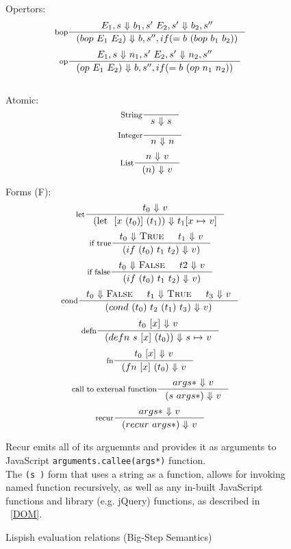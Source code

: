 \begin{figure}[ht]
\centering
Opertors:\
\[
\inference[bop]{E_1, s \ $$\Downarrow$$ \ b_1, s' \ E_2, s' \ $$\Downarrow$$ \ b_2, s''}
{(bop \ E_1 \ E_2) \ $$\Downarrow$$ \ b, s'', if (= b \ (bop \ b_1 \ b_2))}
\]
\[
\inference[op]{E_1, s \ $$\Downarrow$$ \ n_1, s' \ E_2, s' \ $$\Downarrow$$ \ n_2, s''}
{(op \ E_1 \ E_2) \ $$\Downarrow$$ \ b, s'', if (= b \ (op \ n_1 \ n_2))}
\] \\

\vspace*{15pt}
Atomic: \
\[
\inference[String]{}
{s \ $$\Downarrow$$ \ s}
\]
\[
\inference[Integer]{}
{n \ $$\Downarrow$$ \ n}
\]
\[
\inference[List]{n \ $$\Downarrow$$ \ v}
{(n) \ $$\Downarrow$$ \ v}
\]

\vspace*{15pt}
Forms (F): \
\[
\inference[let]{t_0 \ $$\Downarrow$$ \ v}
{(\text{let } \ {[x \ (t_0)]} \ (t_1)) \ $$\Downarrow$$ \ t_1 {[}x \ $$\mapsto$$ \ v{]} }
\]
\[
\inference[if true]{{t_0} \ $$\Downarrow$$ \ \textsc{True} & t_1 \ $$\Downarrow$$ \ v}
{(if \ (t_0) \ t_1 \ t_2) \ $$\Downarrow$$ \ v) }
\]
\[
\inference[if false]{t_0 \ $$\Downarrow$$ \ \textsc{False} & t2 \ $$\Downarrow$$ \ v}
{(if \ (t_0) \ t_1 \ t_2) \ $$\Downarrow$$ \ v) }
\]
\[
\inference[cond]{t_0 \ $$\Downarrow$$ \ \textsc{False} & t_1 \ $$\Downarrow$$ \ \textsc{True} & t_3 \ $$\Downarrow$$ \ v}
{(cond \ (t_0) \ t_2 \ (t_1) \ t_3) \ $$\Downarrow$$ \ v) }
\]
\[
\inference[defn]{ {t_0 \ [x]} \ $$\Downarrow$$ \ v}
{(defn \ s \ {[x]} \ (t_0)) \ $$\Downarrow$$ \ s \ $$\mapsto$$ \ v }
\]
\[
\inference[fn]{ {t_0 \ [x]} \ $$\Downarrow$$ \ v}
{(fn \ {[x]}  \ (t_0) \ $$\Downarrow$$ \ v }
\]
\[
\inference[call to external function]{ {args*} \ $$\Downarrow$$ \ v}
{(s \ {args*}) \ $$\Downarrow$$ \ v }
\]
\[
\inference[recur]{ {args*} \ $$\Downarrow$$ \ v}
{(recur \ {args*}) \ $$\Downarrow$$ \ v }
\]\vspace*{10pt}

Recur emits all of its arguemnts and provides it as arguments to JavaScript 
\texttt{arguments.callee(args*)} function. \\
The \texttt{(s )} form that uses a string as a function, allows for invoking named function recursively, as well as any in-built JavaScript functions and library (e.g. jQuery) functions, as described in ~\ref{DOM}.
\caption{Lispish evaluation relations (Big-Step Semantics)}
\label{fig:lispish-big-step}
\end{figure}